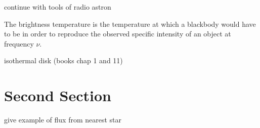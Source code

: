  
continue with tools of radio astron

The brightness temperature is the temperature at which a blackbody would have to be in order to reproduce the observed specific intensity of an object at frequency $\nu$.

isothermal disk (books chap 1 and 11)
 
\section{Second Section}\label{sec:2}
give example of flux from nearest star


